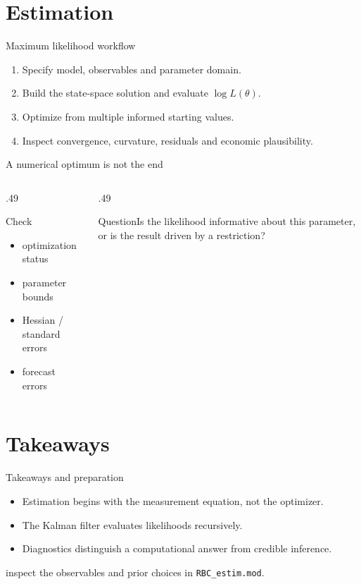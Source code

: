 \documentclass[aspectratio=169,10pt]{beamer}
\begin{document}
\section{Estimation}
\begin{frame}{Maximum likelihood workflow}\begin{enumerate}\item Specify model, observables and parameter domain.\item Build the state-space solution and evaluate \(\log L(\theta)\).\item Optimize from multiple informed starting values.\item Inspect convergence, curvature, residuals and economic plausibility.\end{enumerate}\end{frame}
\begin{frame}{A numerical optimum is not the end}\begin{columns}[T]\begin{column}{.49\textwidth}\begin{block}{Check}\begin{itemize}\item optimization status\item parameter bounds\item Hessian / standard errors\item forecast errors\end{itemize}\end{block}\end{column}\begin{column}{.49\textwidth}\begin{block}{Question}\centering Is the likelihood informative about this parameter, or is the result driven by a restriction?\end{block}\end{column}\end{columns}\end{frame}
\section{Takeaways}
\begin{frame}{Takeaways and preparation}\begin{itemize}\item Estimation begins with the measurement equation, not the optimizer.\item The Kalman filter evaluates likelihoods recursively.\item Diagnostics distinguish a computational answer from credible inference.\end{itemize}\vfill{} inspect the observables and prior choices in \texttt{RBC\_estim.mod}.\end{frame}
\end{document}
